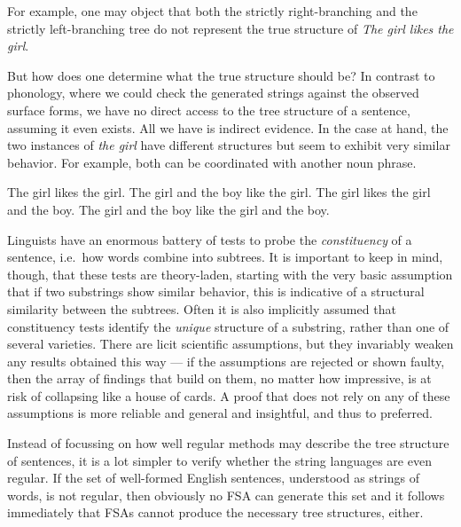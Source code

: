 For example, one may object that both the strictly right-branching and the strictly left-branching tree do not represent the true structure of \emph{The girl likes the girl}.
%
\begin{center}
    
    \hspace{2em}
    
\end{center}
%
But how does one determine what the true structure should be?
In contrast to phonology, where we could check the generated strings against the observed surface forms, we have no direct access to the tree structure of a sentence, assuming it even exists.
All we have is indirect evidence.
In the case at hand, the two instances of \emph{the girl} have different structures but seem to exhibit very similar behavior.
For example, both can be coordinated with another noun phrase.
%
\begin{exe}
    \ex
    \begin{xlist}
        \ex The girl likes the girl.
        \ex The girl and the boy like the girl.
        \ex The girl likes the girl and the boy.
        \ex The girl and the boy like the girl and the boy.
    \end{xlist}
\end{exe}
%
Linguists have an enormous battery of tests to probe the \emph{constituency} of a sentence, i.e.\ how words combine into subtrees.
It is important to keep in mind, though, that these tests are theory-laden, starting with the very basic assumption that if two substrings show similar behavior, this is indicative of a structural similarity between the subtrees.
Often it is also implicitly assumed that constituency tests identify the \emph{unique} structure of a substring, rather than one of several varieties.
There are licit scientific assumptions, but they invariably weaken any results obtained this way --- if the assumptions are rejected or shown faulty, then the array of findings that build on them, no matter how impressive, is at risk of collapsing like a house of cards.
A proof that does not rely on any of these assumptions is more reliable and general and insightful, and thus to preferred.

Instead of focussing on how well regular methods may describe the tree structure of sentences, it is a lot simpler to verify whether the string languages are even regular.
If the set of well-formed English sentences, understood as strings of words, is not regular, then obviously no FSA can generate this set and it follows immediately that FSAs cannot produce the necessary tree structures, either.

